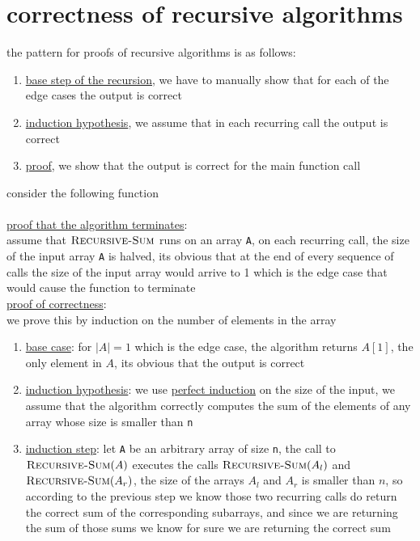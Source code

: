 \documentclass[a4paper,12pt]{article}
\begin{document}
\section{correctness of recursive algorithms}
\label{sec:orgdce3b3c}
the pattern for proofs of recursive algorithms is as follows:\\[0pt]
\begin{enumerate}
\item \uline{base step of the recursion}, we have to manually show that for each of the edge cases the output is correct\\[0pt]
\item \uline{induction hypothesis}, we assume that in each recurring call the output is correct\\[0pt]
\item \uline{proof}, we show that the output is correct for the main function call\\[0pt]
\end{enumerate}
\begin{my_example}
consider the following function\\[0pt]
\\[0pt]

\uline{proof that the algorithm terminates}:\\[0pt]
assume that \(\textsc{Recursive-Sum}\) runs on an array \texttt{A}, on each recurring call, the size of the input array \texttt{A} is halved, its obvious that at the end of every sequence of calls the size of the input array would arrive to 1 which is the edge case that would cause the function to terminate\\[0pt]
\uline{proof of correctness}:\\[0pt]
we prove this by induction on the number of elements in the array\\[0pt]
\begin{enumerate}
\item \uline{base case}: for \(|A|=1\) which is the edge case, the algorithm returns \(A[1]\), the only element in \(A\), its obvious that the output is correct\\[0pt]
\item \uline{induction hypothesis}: we use \href{20220707193301-mathematical_induction.org}{perfect induction} on the size of the input, we assume that the algorithm correctly computes the sum of the elements of any array whose size is smaller than \texttt{n}\\[0pt]
\item \uline{induction step}: let \texttt{A} be an arbitrary array of size \texttt{n}, the call to \(\textsc{Recursive-Sum}(A)\) executes the calls \(\textsc{Recursive-Sum}(A_l)\) and \(\textsc{Recursive-Sum}(A_r)\), the size of the arrays \(A_l\) and \(A_r\) is smaller than \(n\), so according to the previous step we know those two recurring calls do return the correct sum of the corresponding subarrays, and since we are returning the sum of those sums we know for sure we are returning the correct sum\\[0pt]
\end{enumerate}
\end{my_example}
\end{document}
